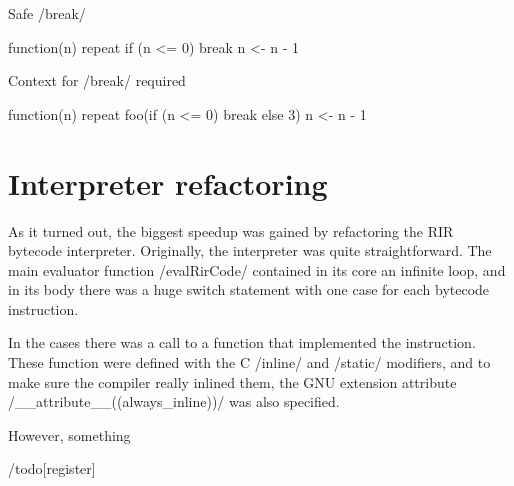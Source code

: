 \begin{listing}[htbp]
  \caption{\label{lst:local-break}Safe \rinline/break/}
  \begin{rcode}
function(n) {
    repeat {
        if (n <= 0) break
        n <- n - 1
    }
}
  \end{rcode}
\end{listing}

\begin{listing}[htbp]
  \caption{\label{lst:non-local-break}Context for \rinline/break/ required}
  \begin{rcode}
function(n) {
    repeat {
        foo(if (n <= 0) break else 3)
        n <- n - 1
    }
}
  \end{rcode}
\end{listing}


\section{Interpreter refactoring}

As it turned out, the biggest speedup was gained by refactoring the RIR bytecode interpreter. Originally, the interpreter was quite straightforward. The main evaluator function \cinline/evalRirCode/ contained in its core an infinite loop, and in its body there was a huge switch statement with one case for each bytecode instruction.

In the cases there was a call to a function that implemented the instruction. These function were defined with the C \cinline/inline/ and \cinline/static/ modifiers, and to make sure the compiler really inlined them, the GNU extension attribute \cinline/__attribute__((always_inline))/ was also specified.

However, something 

\begin{listing}[htbp]
  \caption{\label{lst:}}
  \begin{rcode}

  \end{rcode}
\end{listing}

/todo[register]



